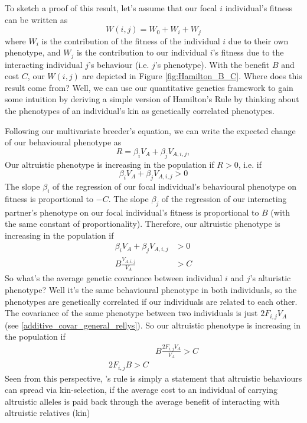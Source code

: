 To sketch a proof of this result, let's assume that our focal $i$ individual's fitness can be written as 
\begin{equation}
W(i,j)= W_0 + W_i +W_j
\end{equation}
where $W_i$ is the contribution of the fitness of the individual $i$ due
to their own phenotype, and $W_j$ is the contribution to our
individual $i$'s fitness due to the interacting individual $j$'s behaviour (i.e. $j$'s phenotype).
With the benefit $B$ and cost $C$, our $W(i,j)$ are depicted in Figure \ref{fig:Hamilton_B_C}. 
Where does this result come from? Well, we can use our quantitative genetics framework to gain some 
intuition by deriving a simple version of Hamilton's Rule by thinking
about the phenotypes of an individual's kin as genetically correlated
phenotypes. 


Following our multivariate breeder's equation, we can write the expected change of our behavioural phenotype as 
\begin{equation}
R = \beta_i V_A + \beta_j V_{A,i,j},
\end{equation}
Our altruistic phenotype is increasing in the population if $R>0$, i.e. if 
\begin{equation}
  \beta_i V_A + \beta_j V_{A,i,j}  > 0 \end{equation}
The slope $\beta_i$ of the regression of our focal individual's
behavioural phenotype on fitness is proportional to $-C$. The slope
$\beta_j$ of the regression of our interacting partner's phenotype on
our focal individual's fitness is proportional to $B$ (with the same
constant of proportionality). Therefore, our altruistic phenotype is increasing in the population if
\begin{eqnarray}
  \beta_i V_A + \beta_j V_{A,i,j} & > 0  \nonumber  \\
 B \frac{V_{A,i,j}}{V_A} & >  C
\end{eqnarray}
So what's the average genetic covariance between
individual $i$ and $j$'s alturistic phenotype? Well it's the same behavioural phenotype in both individuals, so the phenotypes are genetically correlated if our individuals are related to each other. The covariance of the same phenotype between two individuals is just $2 F_{i,j} V_A$ (see \eqref{additive_covar_general_rellys}). So our altruistic phenotype is increasing in the population if 
\begin{eqnarray}
   & B\frac{2 F_{i,j} V_A}{V_A} > C \nonumber  \\
  2 F_{i,j} B > C 
\end{eqnarray}
Seen from this perspective, \citeauthor{hamilton1964genetical}'s rule
is simply a statement that altruistic behaviours can spread via
kin-selection, if the average cost to an individual of carrying altruistic alleles is paid back through the average benefit of interacting with altruistic relatives (kin)


